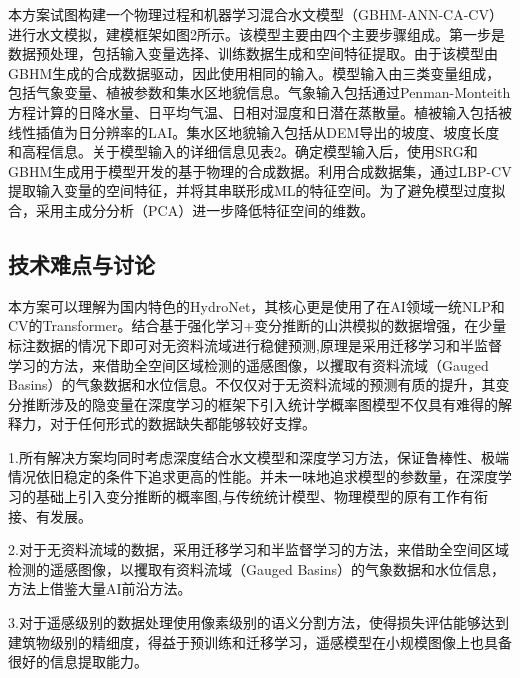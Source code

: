 \documentclass{ctexart}
\begin{document}
本方案试图构建一个物理过程和机器学习混合水文模型（GBHM-ANN-CA-CV）进行水文模拟，建模框架如图2所示。该模型主要由四个主要步骤组成。第一步是数据预处理，包括输入变量选择、训练数据生成和空间特征提取。由于该模型由GBHM生成的合成数据驱动，因此使用相同的输入。模型输入由三类变量组成，包括气象变量、植被参数和集水区地貌信息。气象输入包括通过Penman-Monteith方程计算的日降水量、日平均气温、日相对湿度和日潜在蒸散量。植被输入包括被线性插值为日分辨率的LAI。集水区地貌输入包括从DEM导出的坡度、坡度长度和高程信息。关于模型输入的详细信息见表2。确定模型输入后，使用SRG和GBHM生成用于模型开发的基于物理的合成数据。利用合成数据集，通过LBP-CV提取输入变量的空间特征，并将其串联形成ML的特征空间。为了避免模型过度拟合，采用主成分分析（PCA）进一步降低特征空间的维数。

\subsection{技术难点与讨论}

本方案可以理解为国内特色的HydroNet，其核心更是使用了在AI领域一统NLP和CV的Transformer。结合基于强化学习+变分推断的山洪模拟的数据增强，在少量标注数据的情况下即可对无资料流域进行稳健预测,原理是采用迁移学习和半监督学习的方法，来借助全空间区域检测的遥感图像，以攫取有资料流域（Gauged Basins）的气象数据和水位信息。不仅仅对于无资料流域的预测有质的提升，其变分推断涉及的隐变量在深度学习的框架下引入统计学概率图模型不仅具有难得的解释力，对于任何形式的数据缺失都能够较好支撑。

1.所有解决方案均同时考虑深度结合水文模型和深度学习方法，保证鲁棒性、极端情况依旧稳定的条件下追求更高的性能。并未一味地追求模型的参数量，在深度学习的基础上引入变分推断的概率图,与传统统计模型、物理模型的原有工作有衔接、有发展。

2.对于无资料流域的数据，采用迁移学习和半监督学习的方法，来借助全空间区域检测的遥感图像，以攫取有资料流域（Gauged Basins）的气象数据和水位信息，方法上借鉴大量AI前沿方法。

3.对于遥感级别的数据处理使用像素级别的语义分割方法，使得损失评估能够达到建筑物级别的精细度，得益于预训练和迁移学习，遥感模型在小规模图像上也具备很好的信息提取能力。







\end{document}
